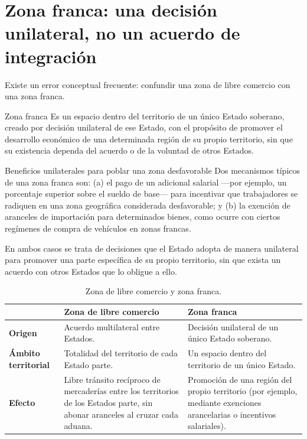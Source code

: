 \documentclass[12pt,oneside]{book}
\begin{document}
\section{Zona franca: una decisión unilateral, no un acuerdo de integración}

Existe un error conceptual frecuente: confundir una zona de libre comercio con una zona franca.

\begin{definition}{Zona franca}
Es un espacio dentro del territorio de un único Estado soberano, creado por decisión unilateral de ese Estado, con el propósito de promover el desarrollo económico de una determinada región de su propio territorio, sin que su existencia dependa del acuerdo o de la voluntad de otros Estados.
\end{definition}

\begin{example}{Beneficios unilaterales para poblar una zona desfavorable}
Dos mecanismos típicos de una zona franca son: (a) el pago de un adicional salarial —por ejemplo, un porcentaje superior sobre el sueldo de base— para incentivar que trabajadores se radiquen en una zona geográfica considerada desfavorable; y (b) la exención de aranceles de importación para determinados bienes, como ocurre con ciertos regímenes de compra de vehículos en zonas francas.

En ambos casos se trata de decisiones que el Estado adopta de manera unilateral para promover una parte específica de su propio territorio, sin que exista un acuerdo con otros Estados que lo obligue a ello.
\end{example}

\begin{table}[H]
\centering
\renewcommand{\arraystretch}{1.3}
\begin{tabularx}{\textwidth}{
    >{\raggedright\arraybackslash}p{}
    >{\raggedright\arraybackslash}X
    >{\raggedright\arraybackslash}X
}
\toprule
 & \textbf{Zona de libre comercio} & \textbf{Zona franca} \\
\midrule
\textbf{Origen} & Acuerdo multilateral entre Estados. & Decisión unilateral de un único Estado soberano. \\
\textbf{Ámbito territorial} & Totalidad del territorio de cada Estado parte. & Un espacio dentro del territorio de un único Estado. \\
\textbf{Efecto} & Libre tránsito recíproco de mercaderías entre los territorios de los Estados parte, sin abonar aranceles al cruzar cada aduana. & Promoción de una región del propio territorio (por ejemplo, mediante exenciones arancelarias o incentivos salariales). \\
\bottomrule
\end{tabularx}
\caption*{Zona de libre comercio y zona franca.}
\end{table}
\end{document}
